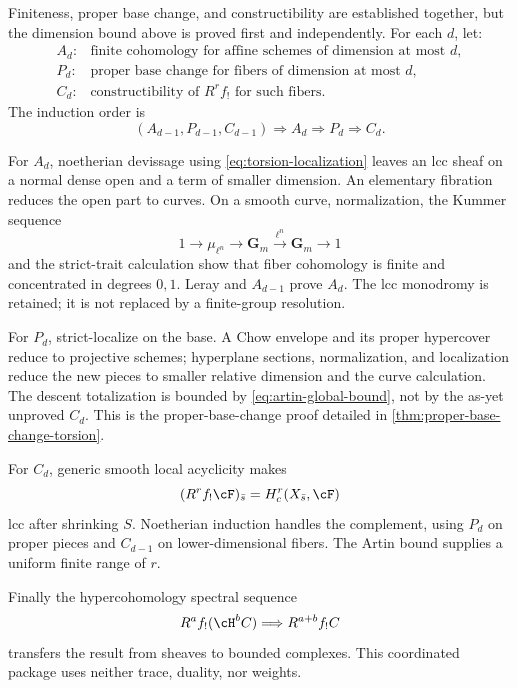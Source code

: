 \begin{foundation}[title={Foundational proof capsule: the simultaneous SGA induction}]
Finiteness, proper base change, and constructibility are established together,
but the dimension bound above is proved first and independently.  For each
\(d\), let:
\[
\begin{array}{ll}
A_d:&\text{finite cohomology for affine schemes of dimension at most }d,\\
P_d:&\text{proper base change for fibers of dimension at most }d,\\
C_d:&\text{constructibility of }R^rf_!\text{ for such fibers}.
\end{array}
\]
The induction order is
\[
 (A_{d-1},P_{d-1},C_{d-1})
 \Longrightarrow A_d\Longrightarrow P_d\Longrightarrow C_d.
\tag{3.4}\label{eq:simultaneous-induction}
\]

For \(A_d\), noetherian devissage using
\eqref{eq:torsion-localization} leaves an lcc sheaf on a normal dense open
and a term of smaller dimension.  An elementary fibration reduces the open
part to curves.  On a smooth curve, normalization, the Kummer sequence
\[
 1\to\mu_{\ell^n}\to\mathbf G_m
   \xrightarrow{\ell^n}\mathbf G_m\to1
\]
and the strict-trait calculation show that fiber cohomology is finite and
concentrated in degrees \(0,1\).  Leray and \(A_{d-1}\) prove \(A_d\).  The
lcc monodromy is retained; it is not replaced by a finite-group resolution.

For \(P_d\), strict-localize on the base.  A Chow envelope and its proper
hypercover reduce to projective schemes; hyperplane sections, normalization,
and localization reduce the new pieces to smaller relative dimension and the
curve calculation.  The descent totalization is bounded by
\eqref{eq:artin-global-bound}, not by the as-yet unproved \(C_d\).  This is the
proper-base-change proof detailed in
\cref{thm:proper-base-change-torsion}.

For \(C_d\), generic smooth local acyclicity makes
\[
 (R^rf_!\cF)_{\bar s}=H^r_c(X_{\bar s},\cF)
\]
lcc after shrinking \(S\).  Noetherian induction handles the complement,
using \(P_d\) on proper pieces and \(C_{d-1}\) on lower-dimensional fibers.
The Artin bound supplies a uniform finite range of \(r\).

Finally the hypercohomology spectral sequence
\[
 R^af_!(\cH^bC)\Longrightarrow R^{a+b}f_!C
\]
transfers the result from sheaves to bounded complexes.  This coordinated
package uses neither trace, duality, nor weights.
\end{foundation}

